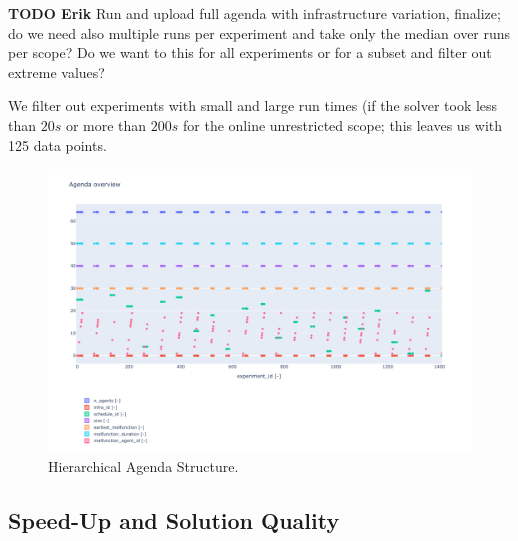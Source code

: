 \documentclass{article}
\begin{document}
\begin{mdframed}
{\bf TODO Erik} Run and upload full agenda with infrastructure variation, finalize; do we need also multiple runs per experiment and take only the median over runs per scope? Do we want to this for all experiments or for a subset and filter out extreme values?
\end{mdframed}


We filter out experiments with small and large run times (if the solver took less than $20s$ or more than $200s$ for the online unrestricted scope; this leaves us with 125 data points.

\begin{figure}[hbtp]
    \includegraphics[width=\textwidth]{Figures/04_computational_results/agenda.pdf}
	\caption{Hierarchical Agenda Structure.}
	\label{fig:agenda}
\end{figure}




\subsection{Speed-Up and Solution Quality}
\end{document}
